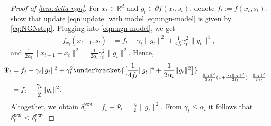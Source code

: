 \documentclass{article}
\newcommand{\R}{\mathbb{R}}
\newcommand{\SGD}{{\texttt{SGD}}}
\newcommand{\NGN}{{\texttt{NGN}}}
\theoremstyle{plain}
\theoremstyle{definition}
\theoremstyle{remark}
\begin{document}
\begin{proof}[Proof of \cref{lem:delta-ngn}]
For $x_t\in \R^d$ and $g_t\in \partial f(x_t,s_t)$, denote $f_t:=f(x_t,s_t)$. \citet{Orvieto2024} show that update \eqref{eqn:update} with model \eqref{eqn:ngn-model} is given by \eqref{eq:NGNstep}.
Plugging into \eqref{eqn:ngn-model}, we get
\begin{align*}
    f_{x_t}(x_{t+1},s_t) &= 
    f_t - \gamma_t \|g_t\|^2 + \frac{1}{4f_t}\gamma_t^2 \|g_t\|^4,
\end{align*}
and $\frac{1}{2\alpha_t}\|x_{t+1}-x_t\|^2 = \frac{1}{2\alpha_t}\gamma_t^2\|g_t\|^2$.
Hence,
\begin{align*}
    \hspace{-3ex}\Psi_t
    &= f_t - \gamma_t \|g_t\|^2 + \gamma_t^2 \underbracket{\big[\frac{1}{4f_t} \|g_t\|^4 + \frac{1}{2\alpha_t}\|g_t\|^2 \big]}_{= \frac{\|g_t\|^2}{2\alpha_t}(1+\frac{\alpha_t\|g_t\|^2}{2f_t}) = \frac{\|g_t\|^2}{2\gamma_t}}\\
    &= f_t - \frac{\gamma_t}{2} \|g_t\|^2.
\end{align*}
Altogether, we obtain $\delta_t^{\NGN{}} = f_t - \Psi_t = \frac{\gamma_t}{2} \|g_t\|^2.$ From $\gamma_t \leq \alpha_t$ it follows that $\delta_t^{\NGN{}} \leq \delta_t^{\SGD{}}$. 
\end{proof}
\end{document}

